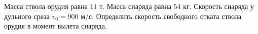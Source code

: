 Масса ствола орудия равна $11$ т. Масса снаряда равна $54$ кг.
Скорость снаряда у дульного среза $v_{0}=900$ м/с.
Определить скорость свободного отката ствола орудия
в момент вылета снаряда.
